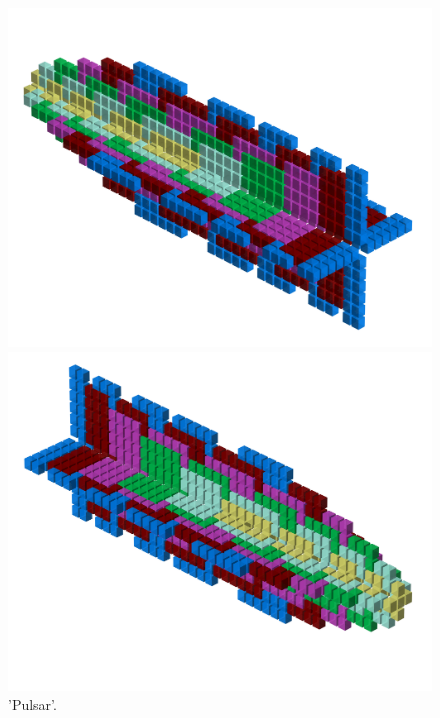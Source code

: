 \begin{figure}[H]
    \centering
    \begin{adjustbox}{width=12cm,center}
      \includegraphics[width=12cm]{src/patterns/pattern7-45.png}%
    \end{adjustbox}
    \begin{adjustbox}{width=12cm,margin=0cm -4cm}
      \includegraphics[width=12cm]{src/patterns/pattern7-225.png}%
    \end{adjustbox}
\caption{'Pulsar'.}
\end{figure}
\clearpage

